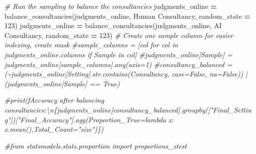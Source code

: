 \documentclass[
]{article}
\newenvironment{Shaded}{\begin{snugshade}}{\end{snugshade}}
\newcommand{\CommentTok}[1]{\textcolor[rgb]{0.56,0.35,0.01}{\textit{#1}}}
\newcommand{\DecValTok}[1]{\textcolor[rgb]{0.00,0.00,0.81}{#1}}
\newcommand{\NormalTok}[1]{#1}
\newcommand{\OperatorTok}[1]{\textcolor[rgb]{0.81,0.36,0.00}{\textbf{#1}}}
\newcommand{\StringTok}[1]{\textcolor[rgb]{0.31,0.60,0.02}{#1}}
\begin{document}
\begin{Shaded}
\begin{Highlighting}[]
\CommentTok{\# Run the sampling to balance the consultancies}
\NormalTok{judgments\_online }\OperatorTok{=}\NormalTok{ balance\_consultancies(judgments\_online, }\StringTok{\textquotesingle{}Human Consultancy\textquotesingle{}}\NormalTok{, random\_state }\OperatorTok{=} \DecValTok{123}\NormalTok{)}
\NormalTok{judgments\_online }\OperatorTok{=}\NormalTok{ balance\_consultancies(judgments\_online, }\StringTok{\textquotesingle{}AI Consultancy\textquotesingle{}}\NormalTok{, random\_state }\OperatorTok{=} \DecValTok{123}\NormalTok{)}
\CommentTok{\# Create one sample column for easier indexing, create mask}
\CommentTok{\#sample\_columns = [col for col in judgments\_online.columns if \textquotesingle{}Sample\textquotesingle{} in col]}
\CommentTok{\#judgments\_online[\textquotesingle{}Sample\textquotesingle{}] = judgments\_online[sample\_columns].any(axis=1)}
\CommentTok{\#consultancy\_balanced = (\textasciitilde{}judgments\_online[\textquotesingle{}Setting\textquotesingle{}].str.contains(\textquotesingle{}Consultancy\textquotesingle{}, case=False, na=False)) | (judgments\_online[\textquotesingle{}Sample\textquotesingle{}] == True)}

\CommentTok{\#print(f\textquotesingle{}Accuracy after balancing consultancies:\textbackslash{}n\{judgments\_online[consultancy\_balanced].groupby(["Final\_Setting"])["Final\_Accuracy"].agg(Proportion\_True=lambda x: x.mean(),Total\_Count="size")\}\textquotesingle{})}


\CommentTok{\#from statsmodels.stats.proportion import proportions\_ztest}


\end{Highlighting}
\end{Shaded}
\end{document}
